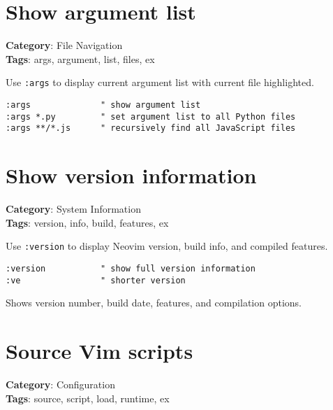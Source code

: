 {{{{{{\section{Show argument list}

\textbf{Category}: File Navigation\\ \textbf{Tags}: args, argument, list, files, ex
\vspace{0.5cm}

Use {\footnotesize \Verb§:args§} to display current argument list with current file highlighted.

\begin{Exa*}{}
\begin{Verbatim}[fontsize=\footnotesize, breaklines, breakanywhere]
:args              " show argument list
:args *.py         " set argument list to all Python files
:args **/*.js      " recursively find all JavaScript files
\end{Verbatim}
\end{Exa*}

\section{Show version information}

\textbf{Category}: System Information\\ \textbf{Tags}: version, info, build, features, ex
\vspace{0.5cm}

Use {\footnotesize \Verb§:version§} to display Neovim version, build info, and compiled features.

\begin{Exa*}{}
\begin{Verbatim}[fontsize=\footnotesize, breaklines, breakanywhere]
:version           " show full version information
:ve                " shorter version
\end{Verbatim}
\end{Exa*}

Shows version number, build date, features, and compilation options.

\section{Source Vim scripts}

\textbf{Category}: Configuration\\ \textbf{Tags}: source, script, load, runtime, ex
\vspace{0.5cm}

}}}}}}
